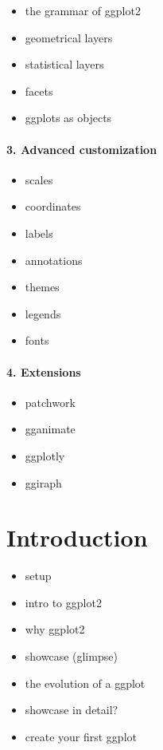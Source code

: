 \documentclass[
]{book}
\providecommand{\tightlist}{%
  \setlength{\itemsep}{0pt}\setlength{\parskip}{0pt}}
\begin{document}
\begin{itemize}
\tightlist
\item
  the grammar of ggplot2
\item
  geometrical layers
\item
  statistical layers
\item
  facets
\item
  ggplots as objects
\end{itemize}

\hypertarget{advanced-customization}{%
\paragraph*{3. Advanced customization}\label{advanced-customization}}

\begin{itemize}
\tightlist
\item
  scales
\item
  coordinates
\item
  labels
\item
  annotations
\item
  themes
\item
  legends
\item
  fonts
\end{itemize}

\hypertarget{extensions}{%
\paragraph*{4. Extensions}\label{extensions}}

\begin{itemize}
\tightlist
\item
  patchwork
\item
  gganimate
\item
  ggplotly
\item
  ggiraph
\end{itemize}

\hypertarget{introduction}{%
\section{Introduction}\label{introduction}}

\begin{itemize}
\tightlist
\item
  setup
\item
  intro to ggplot2
\item
  why ggplot2
\item
  showcase (glimpse)
\item
  the evolution of a ggplot
\item
  showcase in detail?
\item
  create your first ggplot
\end{itemize}
\end{document}
